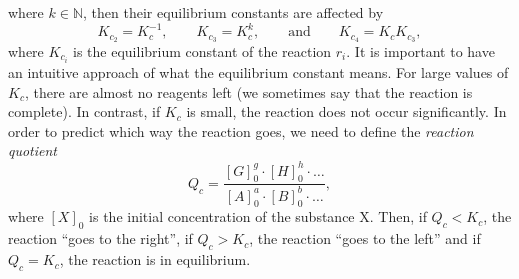 \documentclass[a4paper,10pt]{article}
\newcommand{\mN}{{\mathbb N}}
\theoremstyle{plain}
\theoremstyle{definition}
\theoremstyle{remark}
\newcommand{\quotes}[1]{``#1''}
\begin{document}
where $k\in\mN$, then their equilibrium constants are affected by
\begin{equation}
K_{c_{2}} = K_c^{-1}, \qquad K_{c_{3}} = K_c^k, \qquad \text{and} \qquad K_{c_{4}} = K_c K_{c_{3}},
\end{equation}
where $K_{c_i}$ is the equilibrium constant of the reaction $r_i$.
It is important to have an intuitive approach of what the equilibrium constant means. For large values of $K_c$, there are almost no reagents left (we sometimes say that the reaction is complete). In contrast, if $K_c$ is small, the reaction does not occur significantly. In order to predict which way the reaction goes, we need to define the \textit{reaction quotient}
\begin{equation}
Q_c= \frac{[G]_0^g\cdot [H]_0^h\cdot\dots}{[A]_0^a\cdot [B]_0^b\cdot\dots},
\end{equation}
where $[X]_0$ is the initial concentration of the substance X. Then, if $Q_c<K_c$, the reaction \quotes{goes to the right}, if $Q_c>K_c$, the reaction \quotes{goes to the left} and if $Q_c=K_c$, the reaction is in equilibrium.
\end{document}
